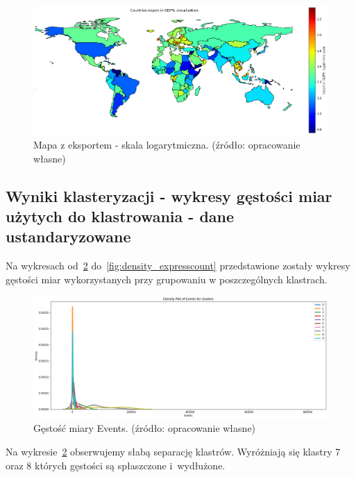 \documentclass[11pt]{report}
\begin{document}
    \begin{figure}[!htp]
        \centering
        \includegraphics[width=\linewidth]{fig/CLUST/export2015.png}
        \caption{Mapa z eksportem - skala logarytmiczna. (źródło: opracowanie własne)}
        \label{fig:clustExport2015_log}
    \end{figure}

    \subsection{Wyniki klasteryzacji - wykresy gęstości miar użytych do klastrowania - dane ustandaryzowane}
    Na wykresach od~\ref{fig:density_events} do~\ref{fig:density_expresscount} przedstawione zostały wykresy gęstości miar wykorzystanych przy grupowaniu w poszczególnych klastrach.

    \begin{figure}[!htp]
        \centering
        \includegraphics[width=\linewidth]{fig/CLUST/density_Events.png}
        \caption{Gęstość miary Events. (źródło: opracowanie własne)}
        \label{fig:density_events}
    \end{figure}

    Na wykresie~\ref{fig:density_events} obserwujemy słabą separację klastrów.
    Wyróżniają się klastry 7 oraz 8 których gęstości są spłaszczone i~wydłużone.
\end{document}
